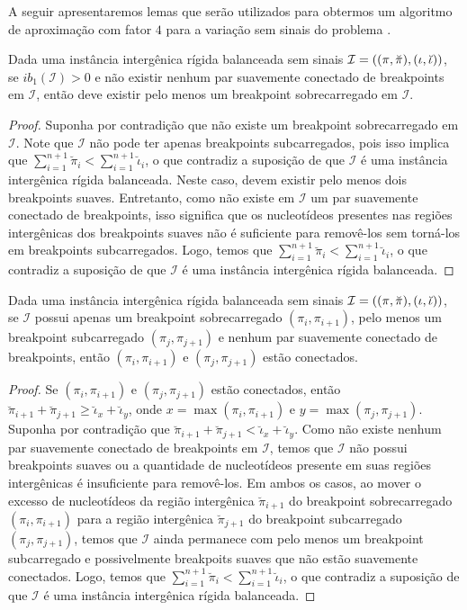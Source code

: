 A seguir apresentaremos lemas que serão utilizados para obtermos um algoritmo de aproximação com fator $4$ para a variação sem sinais do problema \SbIRT{}.

\begin{lemma}\label{lemma:XPQZERDR}
Dada uma instância intergênica rígida balanceada sem sinais $\mathcal{I}=((\pi,\breve\pi),\break(\iota,\breve\iota))$, se $ib_1(\mathcal{I}) > 0$ e não existir nenhum par suavemente conectado de breakpoints em $\mathcal{I}$, então deve existir pelo menos um breakpoint sobrecarregado em $\mathcal{I}$.
\end{lemma}
\begin{proof}
Suponha por contradição que não existe um breakpoint sobrecarregado em $\mathcal{I}$. Note que $\mathcal{I}$ não pode ter apenas breakpoints subcarregados, pois isso implica que $\sum_{i=1}^{n+1}\breve\pi_i < \sum_{i=1}^{n+1}\breve\iota_i$, o que contradiz a suposição de que $\mathcal{I}$ é uma instância intergênica rígida balanceada. Neste caso, devem existir pelo menos dois breakpoints suaves. Entretanto, como não existe em  $\mathcal{I}$ um par suavemente conectado de breakpoints, isso significa que os nucleotídeos presentes nas regiões intergênicas dos breakpoints suaves não é suficiente para removê-los sem torná-los em breakpoints subcarregados. Logo, temos que $\sum_{i=1}^{n+1}\breve\pi_i < \sum_{i=1}^{n+1}\breve\iota_i$, o que contradiz a suposição de que $\mathcal{I}$ é uma instância intergênica rígida balanceada.
\end{proof}

\begin{lemma}\label{lemma:DWXIBBXO}
Dada uma instância intergênica rígida balanceada sem sinais $\mathcal{I}=((\pi,\breve\pi),\break(\iota,\breve\iota))$, se $\mathcal{I}$ possui apenas um breakpoint sobrecarregado $(\pi_i,\pi_{i+1})$, pelo menos um breakpoint subcarregado $(\pi_j,\pi_{j+1})$ e nenhum par suavemente conectado de breakpoints, então $(\pi_i,\pi_{i+1})$ e $(\pi_j,\pi_{j+1})$ estão conectados.
\end{lemma}
\begin{proof}
Se $(\pi_i,\pi_{i+1})$ e $(\pi_j,\pi_{j+1})$ estão conectados, então $\breve\pi_{i+1} + \breve\pi_{j+1} \ge \breve\iota_{x} + \breve\iota_{y}$, onde $x = \max(\pi_i,\pi_{i+1})$ e $y=\max(\pi_j,\pi_{j+1})$. Suponha por contradição que $\breve\pi_{i+1} + \breve\pi_{j+1} < \breve\iota_{x} + \breve\iota_{y}$. Como não existe nenhum par suavemente conectado de breakpoints em $\mathcal{I}$, temos que $\mathcal{I}$ não possui breakpoints suaves ou a quantidade de nucleotídeos presente em suas regiões intergênicas é insuficiente para removê-los. Em ambos os casos, ao mover o excesso de nucleotídeos da região intergênica $\breve\pi_{i+1}$ do breakpoint sobrecarregado $(\pi_i,\pi_{i+1})$ para a região intergênica $\breve\pi_{j+1}$ do breakpoint subcarregado $(\pi_j,\pi_{j+1})$, temos que $\mathcal{I}$ ainda permanece com pelo menos um breakpoint subcarregado e possivelmente breakpoits suaves que não estão suavemente conectados. Logo, temos que $\sum_{i=1}^{n+1}\breve\pi_i < \sum_{i=1}^{n+1}\breve\iota_i$, o que contradiz a suposição de que $\mathcal{I}$ é uma instância intergênica rígida balanceada.
\end{proof}

